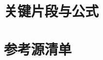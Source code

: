 \documentclass[UTF8]{ctexart}
\begin{document}
\section{关键片段与公式}







\section{参考源清单}
\end{document}

